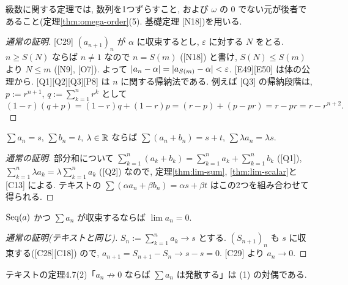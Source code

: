 級数に関する定理では, 数列を1つずらすこと, および $\omega$ の 0 でない元が後者であること(定理\ref{thm:omega-order}(5). 基礎定理 [N18])を用いる.

\begin{lem}\label{lem:series}
\end{lem}
\begin{proof}[通常の証明]
  [C29] $(a_{n+1})_n$ が $\alpha$ に収束するとし, $\varepsilon$ に対する $N$ をとる. $n \geq S(N)$ ならば $n \neq 1$ なので $n = S(m)$ ([N18]) と書け, $S(N) \leq S(m)$ より $N \leq m$ ([N9], [O7]). よって $\lvert a_n - \alpha\rvert = \lvert a_{S(m)} - \alpha\rvert < \varepsilon$. [E49][E50] は体の公理から. [Q1][Q2][Q3][P8] は $n$ に関する帰納法である. 例えば [Q3] の帰納段階は, $p := r^{n+1}$, $q := \sum_{k=1}^n r^k$ として
  \[ (1 - r)(q + p) = (1-r)q + (1-r)p = (r - p) + (p - pr) = r - pr = r - r^{n+2}. \]
\end{proof}

\begin{thm}
  $\sum a_n = s$, $\sum b_n = t$, $\lambda \in \mathbb{R}$ ならば $\sum (a_n + b_n) = s + t$, $\sum \lambda a_n = \lambda s$.
\end{thm}
\begin{proof}[通常の証明]
  部分和について $\sum_{k=1}^n (a_k + b_k) = \sum_{k=1}^n a_k + \sum_{k=1}^n b_k$ ([Q1]), $\sum_{k=1}^n \lambda a_k = \lambda \sum_{k=1}^n a_k$ ([Q2]) なので, 定理\ref{thm:lim-sum}, \ref{thm:lim-scalar}と [C13] による. テキストの $\sum(\alpha a_n + \beta b_n) = \alpha s + \beta t$ はこの2つを組み合わせて得られる.
\end{proof}

\begin{thm}\label{thm:serterm}
  $\mathrm{Seq}(a)$ かつ $\sum a_n$ が収束するならば $\lim a_n = 0$.
\end{thm}
\begin{proof}[通常の証明(テキストと同じ)]
  $S_n := \sum_{k=1}^n a_k \to s$ とする. $(S_{n+1})_n$ も $s$ に収束する([C28][C18]) ので, $a_{n+1} = S_{n+1} - S_n \to s - s = 0$. [C29] より $a_n \to 0$.
\end{proof}

テキストの定理4.7(2)「$a_n \not\to 0$ ならば $\sum a_n$ は発散する」は (1) の対偶である.

